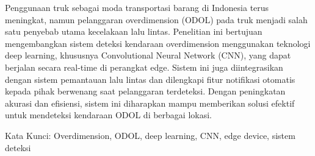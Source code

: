 Penggunaan truk sebagai moda transportasi barang di Indonesia terus meningkat, namun pelanggaran overdimension (ODOL) pada truk menjadi salah satu penyebab utama kecelakaan lalu lintas. Penelitian ini bertujuan mengembangkan sistem deteksi kendaraan overdimension menggunakan teknologi deep learning, khususnya Convolutional Neural Network (CNN), yang dapat berjalan secara real-time di perangkat edge. Sistem ini juga diintegrasikan dengan sistem pemantauan lalu lintas dan dilengkapi fitur notifikasi otomatis kepada pihak berwenang saat pelanggaran terdeteksi. Dengan peningkatan akurasi dan efisiensi, sistem ini diharapkan mampu memberikan solusi efektif untuk mendeteksi kendaraan ODOL di berbagai lokasi.

Kata Kunci: Overdimension, ODOL, deep learning, CNN, edge device, sistem deteksi

